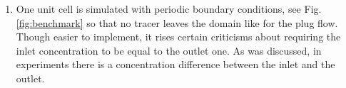 \documentclass{article}
\begin{document}
\begin{enumerate}
\item %
One unit
cell is simulated with
periodic boundary conditions, see Fig. \ref{fig:benchmark} so that no tracer leaves the
domain like for the plug flow. 
Though easier to implement, it rises certain criticisms
about requiring the inlet concentration to be equal to the outlet one. As was
discussed, in experiments there is a concentration difference between the
inlet and the outlet.


\end{enumerate}
\end{document}
